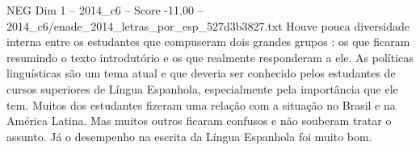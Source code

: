 \begin{textsample}{NEG Dim 1 – 2014\_c6 – Score -11.00 – 2014\_c6/enade\_2014\_letras\_por\_esp\_527d3b3827.txt}
Houve pouca diversidade interna entre os estudantes que compuseram dois grandes grupos : os que ficaram resumindo o texto introdutório e os que realmente responderam a ele.
As políticas linguísticas são um tema atual e que deveria ser conhecido pelos estudantes de cursos superiores de Língua Espanhola, especialmente pela importância que ele tem.
Muitos dos estudantes fizeram uma relação com a situação no Brasil e na América Latina.
Mas muitos outros ficaram confusos e não souberam tratar o assunto.
Já o desempenho na escrita da Língua Espanhola foi muito bom.

\end{textsample}
